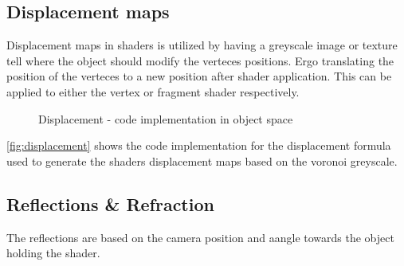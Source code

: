 \documentclass{article}
\begin{document}
\subsection{Displacement maps}
\label{sec:bump_map}
Displacement maps in shaders is utilized by having a greyscale image or texture tell where the object should modify the verteces positions. Ergo translating the position of the verteces to a new position after shader application. This can be applied to either the vertex or fragment shader respectively.

\begin{figure}[H]
    \centering
    
    \caption{Displacement - code implementation in object space}
    \label{fig:displacement}
\end{figure}
\autoref{fig:displacement} shows the code implementation for the displacement formula used to generate the shaders displacement maps based on the voronoi greyscale.

\subsection{Reflections \& Refraction}
\label{sec:refl_refr}
The reflections are based on the camera position and aangle towards the object holding the shader.\\
\end{document}
